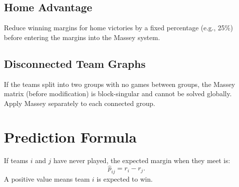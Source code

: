 \subsection*{Home Advantage}

Reduce winning margins for home victories by a fixed percentage (e.g., 25\%) before entering the margins into the Massey system.

\subsection*{Disconnected Team Graphs}

If the teams split into two groups with no games between groups, the Massey matrix (before modification) is block-singular and cannot be solved globally. Apply Massey separately to each connected group.

\section{Prediction Formula}

If teams $i$ and $j$ have never played, the expected margin when they meet is:
\[
  \hat{p}_{ij} = r_i - r_j.
\]
A positive value means team $i$ is expected to win.
